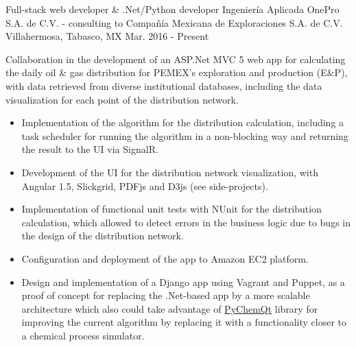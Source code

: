 


\begin{cventries}


\cventry
{Full-stack web developer \& .Net/Python developer} %
{Ingeniería Aplicada OnePro S.A. de C.V. - consulting to Compañía Mexicana de Exploraciones S.A. de C.V.} %
{Villahermosa, Tabasco, MX} %
{Mar. 2016 - Present} %
{ %
	\begin{cvitems}
		\item {Collaboration in the development of an ASP.Net MVC 5 web app for calculating the daily oil \& gas distribution for PEMEX's exploration and production (E\&P), with data retrieved from diverse institutional databases, including the data visualization for each point of the distribution network.}
		\begin{itemize}
			\item {Implementation of the algorithm for the distribution calculation, including a task scheduler for running the algorithm in a non-blocking way and returning the result to the UI via SignalR.}
			\item {Development of the UI for the distribution network visualization, with Angular 1.5, Slickgrid, PDFjs and D3js {\tiny (see side-projects)}.}
			\item {Implementation of functional unit tests with NUnit for the distribution calculation, which allowed to detect errors in the business logic due to bugs in the design of the distribution network.}
			\item {Configuration and deployment of the app to Amazon EC2 platform.}
			\item {Design and implementation of a Django app using Vagrant and Puppet, as a proof of concept for replacing the .Net-based app by a more scalable architecture which also could take advantage of \href{https://github.com/jjgomera/pychemqt}{PyChemQt} library for improving the current algorithm by replacing it with a functionality closer to a chemical process simulator.}
		\end{itemize}
	\end{cvitems}
}


\end{cventries}
